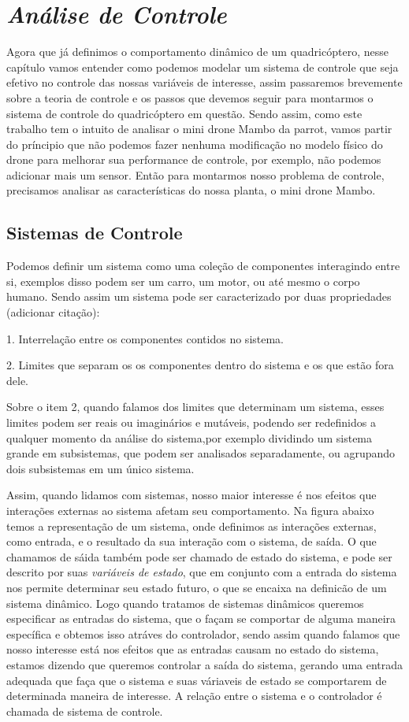 \chapter{\textit{Análise de Controle}}

Agora que já definimos o comportamento dinâmico de um quadricóptero, nesse capítulo vamos entender como podemos modelar um sistema de controle que seja efetivo no controle das nossas variáveis de interesse, assim passaremos brevemente sobre a teoria de controle e os passos que devemos seguir para montarmos o sistema de controle do quadricóptero em questão. Sendo assim, como este trabalho tem o intuito de analisar o mini drone Mambo da parrot, vamos partir do príncipio que não podemos fazer nenhuma modificação no modelo físico do drone para melhorar sua performance de controle, por exemplo, não podemos adicionar mais um sensor. Então para montarmos nosso problema de controle, precisamos analisar as características do nossa planta, o mini drone Mambo.

\section{Sistemas de Controle}

Podemos definir um sistema como uma coleção de componentes interagindo entre si, exemplos disso podem ser um carro, um motor, ou até mesmo o corpo humano. Sendo assim um sistema pode ser caracterizado por duas propriedades (adicionar citação):

1. Interrelação entre os componentes contidos no sistema.

2. Limites que separam os os componentes dentro do sistema e os que estão fora dele.

Sobre o item 2, quando falamos dos limites que determinam um sistema, esses limites podem ser reais ou imaginários e mutáveis, podendo ser redefinidos a qualquer momento da análise do sistema,por exemplo dividindo um sistema grande em subsistemas, que podem ser analisados separadamente, ou agrupando dois subsistemas em um único sistema.

Assim, quando lidamos com sistemas, nosso maior interesse é nos efeitos que interações externas ao sistema afetam seu comportamento. Na figura abaixo temos a representação de um sistema, onde definimos as interações externas, como entrada, e o resultado da sua interação com o sistema, de saída. O que chamamos de sáida também pode ser chamado de estado do sistema, e pode ser descrito por suas \textit{variáveis de estado}, que em conjunto com a entrada do sistema nos permite determinar seu estado futuro, o que se encaixa na definicão de um sistema dinâmico. Logo quando tratamos de sistemas dinâmicos queremos especificar as entradas do sistema, que o façam se comportar de alguma maneira específica e obtemos isso atráves do controlador, sendo assim quando falamos que nosso interesse está nos efeitos que as entradas causam no estado do sistema, estamos dizendo que queremos controlar a saída do sistema, gerando uma entrada adequada que faça que o sistema e suas váriaveis de estado se comportarem de determinada maneira de interesse. A relação entre o sistema e o controlador é chamada de sistema de controle.

